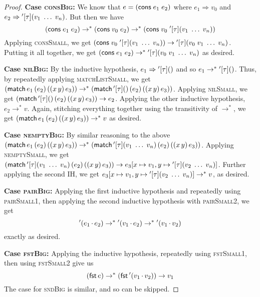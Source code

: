 \documentclass{homework}
\begin{document}
\begin{proof}
  \vspace{0.5em}\noindent\textbf{Case \textsc{consBig}:}
  We know that $e = (\textsf{cons}\;e_1\;e_2)$ where $e_1 \Rightarrow v_0$ and $e_2 \Rightarrow {}'[\tau](v_1\; \ldots\; v_n)$.
  But then we have
  $$(\textsf{cons}\;e_1\;e_2) \to^\ast (\textsf{cons}\;v_0\;e_2) \to^\ast (\textsf{cons}\;v_0\;{}'[\tau](v_1\; \ldots\; v_n))$$
  Applying \textsc{consSmall}, we get $(\textsf{cons}\;v_0\;{}'[\tau](v_1\; \ldots\; v_n)) \to {}'[\tau](v_0\; v_1\; \ldots\; v_n)$.
  Putting it all together, we get $(\textsf{cons}\;e_1\;e_2) \to^\ast {}'[\tau](v_0\; v_1\; \ldots\; v_n)$ as desired.

  \vspace{0.5em}\noindent\textbf{Case \textsc{nilBig}:}
  By the inductive hypothesis, $e_1 \Rightarrow {}'[\tau]()$ and so $e_1 \to^\ast {}'[\tau]()$.
  Thus, by repeatedly applying \textsc{matchListSmall}, we get $(\textsf{match}\,e_1\,(e_2)\,((x\,y)\,e_3)) \to^\ast (\textsf{match}\,{}'[\tau]()\,(e_2)\,((x\,y)\,e_3))$.
  Applying \textsc{nilSmall}, we get $(\textsf{match}\,{}'[\tau]()\,(e_2)\,((x\,y)\,e_3)) \to e_2$.
  Applying the other inductive hypothesis, $e_2 \to^\ast v$.
  Again, stitching everything together using the transitivity of $\to^\ast$, we get $(\textsf{match}\,e_1\,(e_2)\,((x\,y)\,e_3)) \to^\ast v$ as desired.

  \vspace{0.5em}\noindent\textbf{Case \textsc{nemptyBig}:}
  By similar reasoning to the above $(\textsf{match}\,e_1\,(e_2)\,((x\,y)\,e_3)) \to^\ast (\textsf{match}\,{}'[\tau](v_1\; \ldots\; v_n)\,(e_2)\,((x\,y)\,e_3))$.
  Applying \textsc{nemptySmall}, we get $(\textsf{match}\,{}'[\tau](v_1\; \ldots\; v_n)\,(e_2)\,((x\,y)\,e_3)) \to e_3[x \mapsto v_1, y \mapsto {}'[\tau](v_2\; \ldots\; v_n)]$.
  Further applying the second IH, we get $e_3[x \mapsto v_1, y \mapsto {}'[\tau](v_2\; \ldots\; v_n)] \to^\ast v$, as desired.

  \vspace{0.5em}\noindent\textbf{Case \textsc{pairBig}:}
  Applying the first inductive hypothesis and repeatedly using \textsc{pairSmall1}, then applying the second inductive hypothesis with \textsc{pairSmall2}, we get
  $$
  {}'(e_1 \mathop{.} e_2) \to^\ast {}'(v_1 \mathop{.} e_2) \to^\ast {}'(v_1 \mathop{.} v_2)
  $$
  exactly as desired.

  \vspace{0.5em}\noindent\textbf{Case \textsc{fstBig}:}
  Applying the inductive hypothesis, repeatedly using \textsc{fstSmall1}, then using \textsc{fstSmall2} give us
  $$
  (\textsf{fst}\,e) \to^\ast (\textsf{fst}\,{}'(v_1 \mathop{.} v_2)) \to v_1
  $$
  The case for \textsc{sndBig} is similar, and so can be skipped.


\end{proof}
\end{document}
